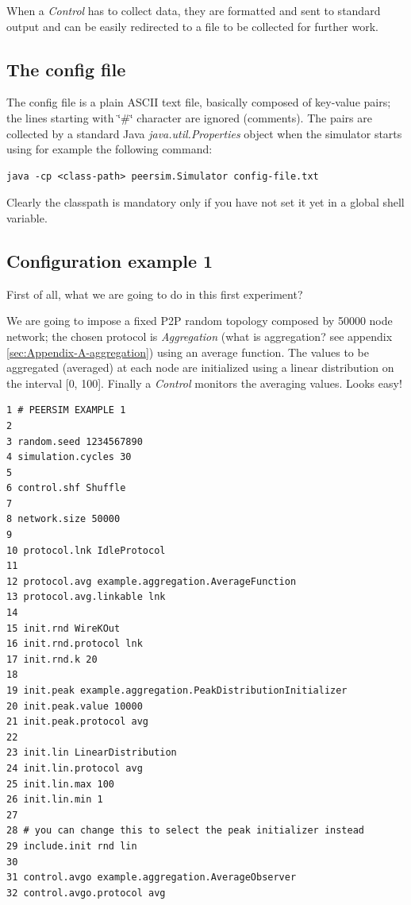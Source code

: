 \documentclass[a4paper,11pt]{article}
\begin{document}
When a \emph{Control} has to collect data, they are formatted and sent to
standard output and can be easily redirected to a file to be collected
for further work. 


\subsection{The config file}
\label{configfile}

The config file is a plain ASCII text file, basically composed of
key-value pairs; the lines starting with \char`\"{}\#\char`\"{} character
are ignored (comments). The pairs are collected by a standard Java
\emph{java.util.Properties} object when the simulator starts using
for example the following command:

\begin{verbatim}
java -cp <class-path> peersim.Simulator config-file.txt \end{verbatim}


Clearly the classpath is mandatory only if you have not set it yet
in a global shell variable.

\subsection{Configuration example 1}

First of all, what we are going to do in this first experiment? 

We are going to impose a fixed P2P random topology composed by 50000
node network; the chosen protocol is \emph{Aggregation} (what is
aggregation? see appendix \ref{sec:Appendix-A-aggregation}) using
an average function. The values to be aggregated (averaged) at each
node are initialized using a linear distribution on the interval {[}0,
100{]}. Finally a \emph{Control} monitors the averaging values.
Looks easy!

\footnotesize
\begin{verbatim}
1 # PEERSIM EXAMPLE 1
2
3 random.seed 1234567890
4 simulation.cycles 30
5
6 control.shf Shuffle
7
8 network.size 50000
9  
10 protocol.lnk IdleProtocol
11
12 protocol.avg example.aggregation.AverageFunction
13 protocol.avg.linkable lnk
14 
15 init.rnd WireKOut
16 init.rnd.protocol lnk
17 init.rnd.k 20
18 
19 init.peak example.aggregation.PeakDistributionInitializer
20 init.peak.value 10000
21 init.peak.protocol avg
22
23 init.lin LinearDistribution
24 init.lin.protocol avg
25 init.lin.max 100
26 init.lin.min 1
27
28 # you can change this to select the peak initializer instead
29 include.init rnd lin
30
31 control.avgo example.aggregation.AverageObserver
32 control.avgo.protocol avg
\end{verbatim}
\normalsize
\end{document}
